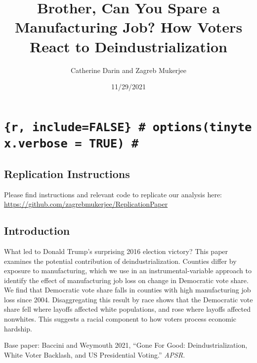 \documentclass[
  12pt,
]{article}
\title{Brother, Can You Spare a Manufacturing Job? How Voters React to
Deindustrialization}
\author{Catherine Darin and Zagreb Mukerjee}
\date{11/29/2021}
\begin{document}
\maketitle

\renewcommand{\arraystretch}{1.1}
\renewcommand{\topfraction}{.85}
\renewcommand{\bottomfraction}{.7}
\renewcommand{\textfraction}{.15}
\renewcommand{\floatpagefraction}{.66}
\setcounter{topnumber}{3}
\setcounter{bottomnumber}{3}
\setcounter{totalnumber}{4}

\hypertarget{r-includefalse-optionstinytex.verbose-true}{%
\section{\texorpdfstring{\texttt{\{r,\ include=FALSE\}\ \#\ options(tinytex.verbose\ =\ TRUE)\ \#}}{\{r, include=FALSE\} \# options(tinytex.verbose = TRUE) \#}}\label{r-includefalse-optionstinytex.verbose-true}}

\hypertarget{replication-instructions}{%
\subsection{Replication Instructions}\label{replication-instructions}}

Please find instructions and relevant code to replicate our analysis
here: \url{https://github.com/zagrebmukerjee/ReplicationPaper}

\hypertarget{introduction}{%
\subsection{Introduction}\label{introduction}}

What led to Donald Trump's surprising 2016 election victory? This paper
examines the potential contribution of deindustrialization. Counties
differ by exposure to manufacturing, which we use in an
instrumental-variable approach to identify the effect of manufacturing
job loss on change in Democratic vote share. We find that Democratic
vote share falls in counties with high manufacturing job loss since
2004. Disaggregating this result by race shows that the Democratic vote
share fell where layoffs affected white populations, and rose where
layoffs affected nonwhites. This suggests a racial component to how
voters process economic hardship.

Base paper: Baccini and Weymouth 2021, ``Gone For Good:
Deindustrialization, White Voter Backlash, and US Presidential Voting.''
\emph{APSR}.
\end{document}
